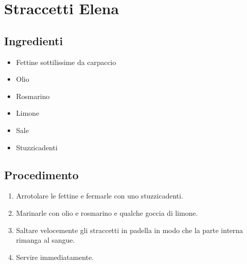 \section{Straccetti Elena}
\subsection{Ingredienti}
\begin{itemize}
\item Fettine sottilissime da carpaccio  
\item Olio  
\item Rosmarino  
\item Limone  
\item Sale   
\item Stuzzicadenti
\end{itemize}
\subsection{Procedimento}
\begin{enumerate}
\item  Arrotolare le fettine e fermarle con uno stuzzicadenti.  
\item  Marinarle con olio e rosmarino e qualche goccia di limone.  
\item  Saltare velocemente gli straccetti in padella in modo che la parte interna rimanga al sangue.  
\item  Servire immediatamente.
\end{enumerate}

